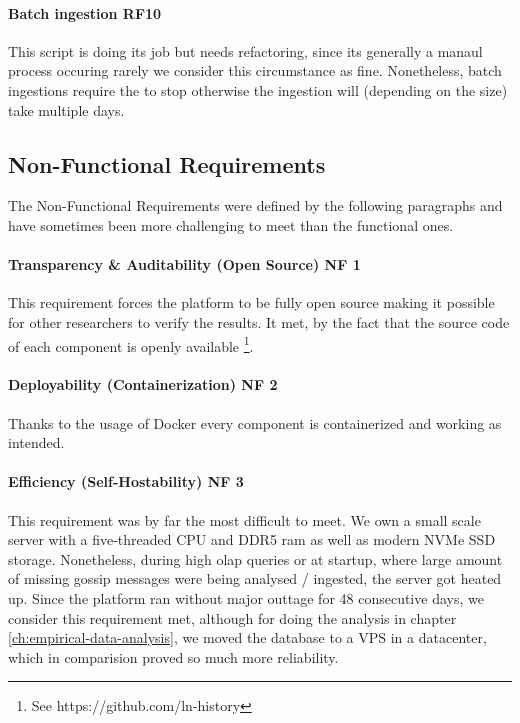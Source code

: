 \paragraph{Batch ingestion RF10}
This script is doing its job but needs refactoring, since its generally a manaul 
process occuring rarely we consider this circumstance as fine.
Nonetheless, batch ingestions require the  to stop
otherwise the ingestion will (depending on the size) take multiple days.


\subsection{Non-Functional Requirements}
The Non-Functional Requirements were defined by the following paragraphs and 
have sometimes been more challenging to meet than the functional ones.

\paragraph{Transparency \& Auditability (Open Source) NF 1}
This requirement forces the  platform to be fully open source
making it possible for other researchers to verify the results.
It met, by the fact that the source code of each component is openly available
\footnote{See https://github.com/ln-history}.


\paragraph{Deployability (Containerization) NF 2}
Thanks to the usage of Docker every component is containerized and working as intended.

\paragraph{Efficiency (Self-Hostability) NF 3}
This requirement was by far the most difficult to meet. 
We own a small scale server with a five-threaded CPU and DDR5 \gls{ram} as well
as modern NVMe SSD storage.
Nonetheless, during high \gls{olap} queries or at startup, where large amount
of missing gossip messages were being analysed / ingested, the server got heated up.
Since the platform ran without major outtage for 48 consecutive days, we consider this
requirement met, although for doing the analysis in chapter \autoref{ch:empirical-data-analysis},
we moved the database to a VPS in a datacenter, which in comparision proved so much more reliability.


